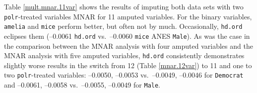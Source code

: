 \documentclass[12pt,econ]{sources/authesis}
\begin{document}
Table \ref{mult.mnar.11var} shows the results of imputing both data sets with two \texttt{polr}-treated variables MNAR for 11 amputed variables. For the binary variables, \texttt{amelia} and \texttt{mice} perform better, but often not by much. Occasionally, \texttt{hd.ord} eclipses them (--0.0061 \texttt{hd.ord} vs.~--0.0060 \texttt{mice} ANES \texttt{Male}). As was the case in the comparison between the MNAR analysis with four amputed variables and the MNAR analysis with five amputed variables, \texttt{hd.ord} consistently demonstrates slightly worse results in the switch from 12 (Table \ref{mnar.12var}) to 11 and one to two \texttt{polr}-treated variables: --0.0050, --0.0053 vs.~--0.0049, --0.0046 for \texttt{Democrat} and --0.0061, --0.0058 vs.~--0.0055, --0.0049 for \texttt{Male}.

\ssp
\end{document}
